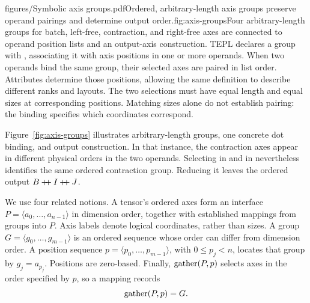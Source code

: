 \begin{figuretext}{figures/Symbolic axis groups.pdf}{Ordered, arbitrary-length axis groups preserve operand pairings and determine output order.}{fig:axis-groups}{Four arbitrary-length groups for batch, left-free, contraction, and right-free
axes are connected to operand position lists and an output-axis construction.}
TEPL declares a group with , associating it with axis positions in
one or more operands. When two operands bind the same group, their selected
axes are paired in list order. Attributes determine those positions, allowing
the same definition to describe different ranks and layouts. The two selections
must have equal length and equal sizes at corresponding positions. Matching
sizes alone do not establish pairing: the binding specifies which coordinates
correspond.

Figure~\ref{fig:axis-groups} illustrates arbitrary-length groups, one concrete
dot binding, and output construction. In that instance, the contraction axes
appear in different physical orders in the two operands. Selecting \code{[2,3]}
in  and \code{[5,2]} in  nevertheless identifies the same
ordered contraction group. Reducing it leaves the ordered output
$B\mathbin{+\!\!+} I\mathbin{+\!\!+} J$.


We use four related notions. A tensor's ordered axes form an interface
$P=\langle a_0,\ldots,a_{n-1}\rangle$ in dimension order, together with established
mappings from groups into $P$. Axis labels denote logical coordinates, rather
than sizes. A group $G=\langle g_0,\ldots,g_{m-1}\rangle$ is an ordered
sequence whose order can differ from dimension order. A position sequence
$p=\langle p_0,\ldots,p_{m-1}\rangle$, with $0\leq p_j<n$, locates that
group by $g_j=a_{p_j}$. Positions are zero-based. Finally, $\operatorname{gather}(P,p)$
selects axes in the order specified by $p$, so a mapping records
\begin{equation}
 \operatorname{gather}(P,p)=G.
 \label{eq:mapping}
\end{equation}
\end{figuretext}

